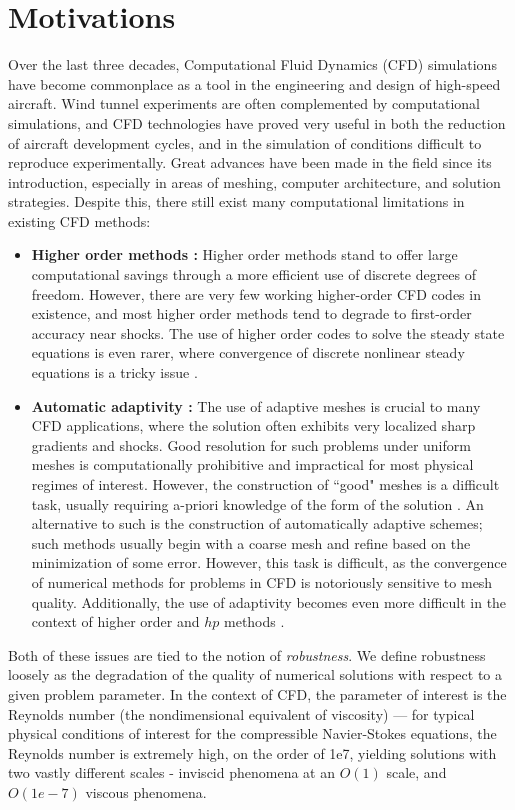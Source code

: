 
\section{Motivations}

Over the last three decades, Computational Fluid Dynamics (CFD) simulations have become commonplace as a tool in the engineering and design of high-speed aircraft.  Wind tunnel experiments are often complemented by computational simulations, and CFD technologies have proved very useful in both the reduction of aircraft development cycles, and in the simulation of conditions difficult to reproduce experimentally.  Great advances have been made in the field since its introduction, especially in areas of meshing, computer architecture, and solution strategies.  Despite this, there still exist many computational limitations in existing CFD methods:  
\begin{itemize}
\item \textbf{Higher order methods :} Higher order methods stand to offer large computational savings through a more efficient use of discrete degrees of freedom.  However, there are very few working higher-order CFD codes in existence, and most higher order methods tend to degrade to first-order accuracy near shocks. The use of higher order codes to solve the steady state equations is even rarer, where convergence of discrete nonlinear steady equations is a tricky issue \cite{BoeingHigherOrder}.  
\item \textbf{Automatic adaptivity :} The use of adaptive meshes is crucial to many CFD applications, where the solution often exhibits very localized sharp gradients and shocks.  Good resolution for such problems under uniform meshes is computationally prohibitive and impractical for most physical regimes of interest.  However, the construction of ``good" meshes is a difficult task, usually requiring a-priori knowledge of the form of the solution \cite{andersonCFDBook}.  An alternative to such is the construction of automatically adaptive schemes; such methods usually begin with a coarse mesh and refine based on the minimization of some error.  However, this task is difficult, as the convergence of numerical methods for problems in CFD is notoriously sensitive to mesh quality.  Additionally, the use of adaptivity becomes even more difficult in the context of higher order and $hp$ methods \cite{BoeingHigherOrder}.  
\end{itemize}
Both of these issues are tied to the notion of \emph{robustness}.  We define robustness loosely as the degradation of the quality of numerical solutions with respect to a given problem parameter.  In the context of CFD, the parameter of interest is the Reynolds number (the nondimensional equivalent of viscosity) --- for typical physical conditions of interest for the compressible Navier-Stokes equations, the Reynolds number is extremely high, on the order of 1e7, yielding solutions with two vastly different scales - inviscid phenomena at an $O(1)$ scale, and $O(1e-7)$ viscous phenomena.  

